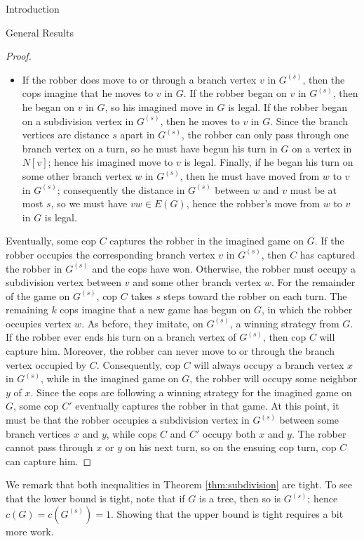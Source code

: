 \documentclass[12pt]{amsart}
\theoremstyle{definition}
\begin{document}
\begin{section}{Introduction}
\begin{section}{General Results}
\begin{proof}
\begin{itemize}
    \item If the robber does move to or through a branch vertex $v$ in $G^{(s)}$, then the cops imagine that he moves to $v$ in $G$.  If the robber began on $v$ in $G^{(s)}$, then he began on $v$ in $G$, so his imagined move in $G$ is legal.  If the robber began on a subdivision vertex in $G^{(s)}$, then he moves to $v$ in $G$.  Since the branch vertices are distance $s$ apart in $G^{(s)}$, the robber can only pass through one branch vertex on a turn, so he must have begun his turn in $G$ on a vertex in $N[v]$; hence his imagined move to $v$ is legal.  Finally, if he began his turn on some other branch vertex $w$ in $G^{(s)}$, then he must have moved from $w$ to $v$ in $G^{(s)}$; consequently the distance in $G^{(s)}$ between $w$ and $v$ must be at most $s$, so we must have $vw \in E(G)$, hence the robber's move from $w$ to $v$ in $G$ is legal.  
    \end{itemize}
    
    Eventually, some cop $C$ captures the robber in the imagined game on $G$. If the robber occupies the corresponding branch vertex $v$ in $G^{(s)}$, then $C$ has captured the robber in $G^{(s)}$ and the cops have won.  Otherwise, the robber must occupy a subdivision vertex between $v$ and some other branch vertex $w$.  For the remainder of the game on $G^{(s)}$, cop $C$ takes $s$ steps toward the robber on each turn.  The remaining $k$ cops imagine that a new game has begun on $G$, in which the robber occupies vertex $w$.  As before, they imitate, on $G^{(s)}$, a winning strategy from $G$.  If the robber ever ends his turn on a branch vertex of $G^{(s)}$, then cop $C$ will capture him.  Moreover, the robber can never move to or through the branch vertex occupied by $C$.  Consequently, cop $C$ will always occupy a branch vertex $x$ in $G^{(s)}$, while in the imagined game on $G$, the robber will occupy some neighbor $y$ of $x$.  Since the cops are following a winning strategy for the imagined game on  $G$, some cop $C'$ eventually captures the robber in that game.  At this point, it must be that the robber occupies a subdivision vertex in $G^{(s)}$ between some branch vertices $x$ and $y$, while cops $C$ and $C'$ occupy both $x$ and $y$.  The robber cannot pass through $x$ or $y$ on his next turn, so on the ensuing cop turn, cop $C$ can capture him.
\end{proof}

We remark that both inequalities in Theorem \ref{thm:subdivision} are tight.  To see that the lower bound is tight, note that if $G$ is a tree, then so is $G^{(s)}$; hence $c(G) = c(G^{(s)}) = 1$.  Showing that the upper bound is tight requires a bit more work.


\end{section}
\end{section}
\end{document}
